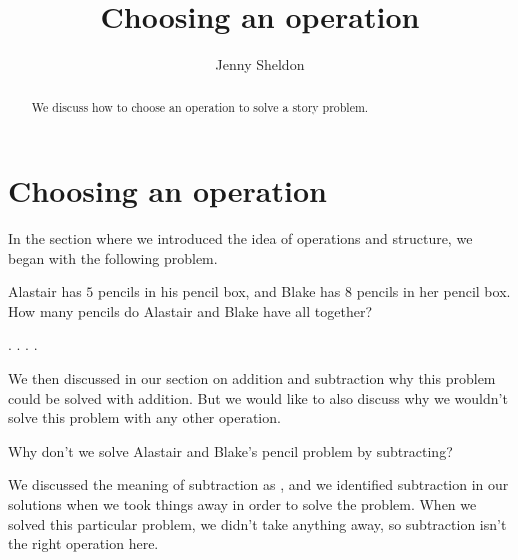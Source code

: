 \documentclass{ximera}
\title{Choosing an operation}
\author{Jenny Sheldon}
\begin{document}
\begin{abstract}
We discuss how to choose an operation to solve a story problem.
\end{abstract}
\maketitle



\section{Choosing an operation}

In the section where we introduced the idea of operations and structure, we began with the following problem. 

\begin{question}
Alastair has $5$ pencils in his pencil box, and Blake has $8$ pencils in her pencil box. How many pencils do Alastair and Blake have all together?

\begin{multipleChoice}
.
.
.
.
\end{multipleChoice}
\end{question}

We then discussed in our section on addition and subtraction why this problem could be solved with addition. But we would like to also discuss why we wouldn't solve this problem with any other operation.

\begin{question}
Why don't we solve Alastair and Blake's pencil problem by subtracting?

\begin{explanation}
We discussed the meaning of subtraction as , and we identified subtraction in our solutions when we took things away in order to solve the problem. When we solved this particular problem, we didn't take anything away, so subtraction isn't the right operation here.
\end{explanation}
\end{question}
\end{document}
